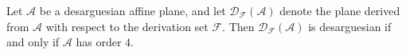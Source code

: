 Let $\mathcal{A}$ be a desarguesian affine plane, and let $\mathcal{D}_{\mathcal{F}}(\mathcal{A})$ denote the plane derived from $\mathcal{A}$ with respect to the derivation set $\mathcal{F}$. Then $\mathcal{D}_{\mathcal{F}}(\mathcal{A})$ is desarguesian if and only if $\mathcal{A}$ has order $4$.
